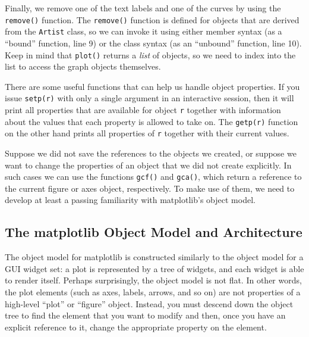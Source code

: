Finally, we remove one of the text labels and one of the curves by
using the \texttt{remove()} function.  The \texttt{remove()} function
is defined for objects that are derived from the \texttt{Artist}
class, so we can invoke it using either member syntax (as a ``bound''
function, line 9) or the class syntax (as an ``unbound'' function,
line 10). Keep in mind that \texttt{plot()} returns a \emph{list} of
objects, so we need to index into the list to access the graph objects
themselves.

There are some useful functions that can help us handle object
properties. If you issue \texttt{setp(r)}  with only a single argument
in an interactive session, then it will print all properties that are
available for object  \texttt{r} together with information about the
values that each property is allowed to take on. The \texttt{getp(r)}
function  on the other hand prints all properties of \texttt{r}
together with their current values.


Suppose we did not save the references to the objects we created, or
suppose we want to change the properties of an object that we did not
create explicitly. In such cases we can use the functions
\texttt{gcf()}  and \texttt{gca()}, which return a\vadjust{\pagebreak} reference to the
current figure or axes object, respectively. To make use of them, we
need to develop at least a passing familiarity with matplotlib's
object model. 


\subsection{The matplotlib Object Model and Architecture}

  

The object model for matplotlib is constructed similarly to the object
model for a GUI widget set: a plot is represented by a tree of
widgets, and each widget is able to render itself.  Perhaps
surprisingly, the object model is not flat. In other words, the plot
elements (such as axes, labels, arrows, and so on) are not properties
of a high-level ``plot'' or ``figure'' object. Instead, you must
descend down the object tree to find the element that you want to
modify and then, once you have an explicit reference to it, change the
appropriate property on the element.

